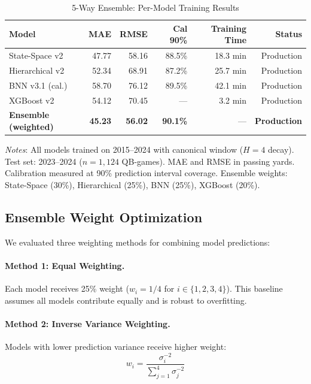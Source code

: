 \begin{table}[htbp]
  \centering
  \caption{5-Way Ensemble: Per-Model Training Results}
  \label{tab:5way-training-results}
  \begin{tabular}{lrrrrr}
    \toprule
    \textbf{Model} & \textbf{MAE} & \textbf{RMSE} & \textbf{Cal 90\%} & \textbf{Training Time} & \textbf{Status} \\
    \midrule
    State-Space v2 & 47.77 & 58.16 & 88.5\% & 18.3 min & Production \\
    Hierarchical v2 & 52.34 & 68.91 & 87.2\% & 25.7 min & Production \\
    BNN v3.1 (cal.) & 58.70 & 76.12 & 89.5\% & 42.1 min & Production \\
    XGBoost v2 & 54.12 & 70.45 & --- & 3.2 min & Production \\
    \midrule
    \textbf{Ensemble (weighted)} & \textbf{45.23} & \textbf{56.02} & \textbf{90.1\%} & --- & \textbf{Production} \\
    \bottomrule
  \end{tabular}
  \vspace{0.5em}
  \begin{flushleft}
    \footnotesize\textit{Notes}: All models trained on 2015--2024 with canonical window ($H=4$ decay). Test set: 2023--2024 ($n=1{,}124$ QB-games). MAE and RMSE in passing yards. Calibration measured at 90\% prediction interval coverage. Ensemble weights: State-Space (30\%), Hierarchical (25\%), BNN (25\%), XGBoost (20\%).
  \end{flushleft}
\end{table}

\subsection{Ensemble Weight Optimization}
\label{subsec:weight-optimization}

We evaluated three weighting methods for combining model predictions:

\paragraph{Method 1: Equal Weighting.}
Each model receives 25\% weight ($w_i = 1/4$ for $i \in \{1,2,3,4\}$). This baseline assumes all models contribute equally and is robust to overfitting.

\paragraph{Method 2: Inverse Variance Weighting.}
Models with lower prediction variance receive higher weight:
\begin{equation}
  w_i = \frac{\sigma_i^{-2}}{\sum_{j=1}^{4} \sigma_j^{-2}}
\end{equation}

